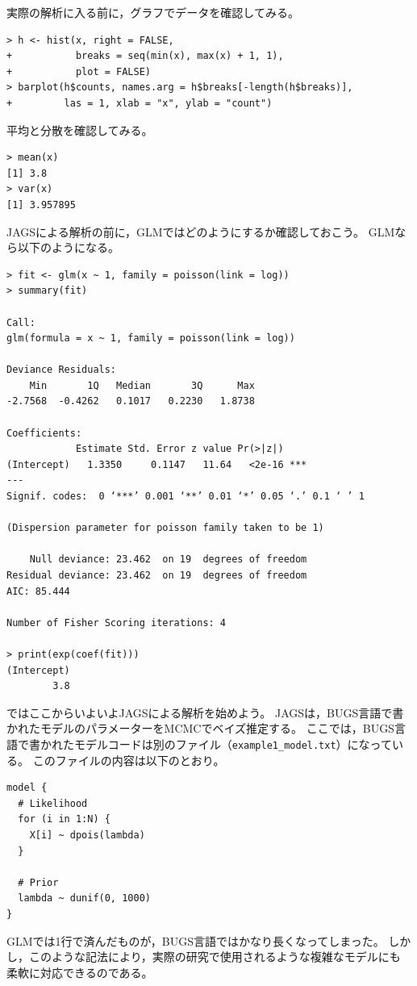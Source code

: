 \documentclass[11pt,uplatex]{jsarticle}
\begin{document}
実際の解析に入る前に，グラフでデータを確認してみる。
\begin{lstlisting}
> h <- hist(x, right = FALSE,
+           breaks = seq(min(x), max(x) + 1, 1),
+           plot = FALSE)
> barplot(h$counts, names.arg = h$breaks[-length(h$breaks)],
+         las = 1, xlab = "x", ylab = "count")
\end{lstlisting}

平均と分散を確認してみる。
\begin{lstlisting}
> mean(x)
[1] 3.8
> var(x)
[1] 3.957895
\end{lstlisting}

\textsf{JAGS}による解析の前に，GLMではどのようにするか確認しておこう。
GLMなら以下のようになる。
\begin{lstlisting}
> fit <- glm(x ~ 1, family = poisson(link = log))
> summary(fit)

Call:
glm(formula = x ~ 1, family = poisson(link = log))

Deviance Residuals: 
    Min       1Q   Median       3Q      Max  
-2.7568  -0.4262   0.1017   0.2230   1.8738  

Coefficients:
            Estimate Std. Error z value Pr(>|z|)    
(Intercept)   1.3350     0.1147   11.64   <2e-16 ***
---
Signif. codes:  0 ‘***’ 0.001 ‘**’ 0.01 ‘*’ 0.05 ‘.’ 0.1 ‘ ’ 1

(Dispersion parameter for poisson family taken to be 1)

    Null deviance: 23.462  on 19  degrees of freedom
Residual deviance: 23.462  on 19  degrees of freedom
AIC: 85.444

Number of Fisher Scoring iterations: 4

> print(exp(coef(fit)))
(Intercept) 
        3.8 
\end{lstlisting}

\vspace{1zw}

ではここからいよいよ\textsf{JAGS}による解析を始めよう。
\textsf{JAGS}は，\textsf{BUGS}言語で書かれたモデルのパラメーターをMCMCでベイズ推定する。
ここでは，\textsf{BUGS}言語で書かれたモデルコードは別のファイル（\texttt{example1\_model.txt}）になっている。
このファイルの内容は以下のとおり。
\begin{lstlisting}
model {
  # Likelihood
  for (i in 1:N) {
    X[i] ~ dpois(lambda)
  }

  # Prior
  lambda ~ dunif(0, 1000)
}
\end{lstlisting}
%
GLMでは1行で済んだものが，\textsf{BUGS}言語ではかなり長くなってしまった。
しかし，このような記法により，実際の研究で使用されるような複雑なモデルにも
柔軟に対応できるのである。
\end{document}
